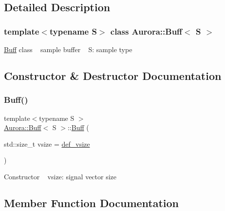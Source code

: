 \subsection{Detailed Description}
\subsubsection*{template$<$typename S$>$\newline
class Aurora\+::\+Buff$<$ S $>$}

\hyperlink{class_aurora_1_1_buff}{Buff} class ~\newline
sample buffer ~\newline
S\+: sample type 

\subsection{Constructor \& Destructor Documentation}
\mbox{\label{class_aurora_1_1_buff_aa6a1980c02f6f9e416bbc59905e847ad}} 
\subsubsection{\texorpdfstring{Buff()}{Buff()}}
{\footnotesize\ttfamily template$<$typename S $>$ \\
\hyperlink{class_aurora_1_1_buff}{Aurora\+::\+Buff}$<$ S $>$\+::\hyperlink{class_aurora_1_1_buff}{Buff} (\begin{DoxyParamCaption}\item[{std\+::size\+\_\+t}]{vsize = {\ttfamily \hyperlink{namespace_aurora_afaaddf667a06e7ce23c667a8b7295263}{def\+\_\+vsize}} }\end{DoxyParamCaption})\hspace{0.3cm}{\ttfamily [inline]}}

Constructor ~\newline
vsize\+: signal vector size 

\subsection{Member Function Documentation}
\mbox{\label{class_aurora_1_1_buff_afd7878cb1948f8d41dfd635c163d1c27}} 
